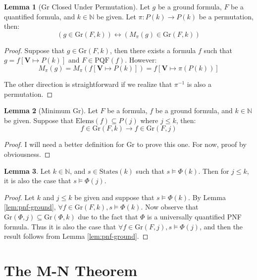 \documentclass[12pt]{article}
\theoremstyle{definition}
\newtheorem{lemma}{Lemma}
\theoremstyle{remark}
\newcommand{\states}{\text{States}}
\newcommand{\gr}{\text{Gr}}
\newcommand{\elems}{\text{Elems}}
\newcommand{\PQF}{\text{PQF}}
\begin{document}
\begin{lemma}[Gr Closed Under Permutation]
  \label{lem:gr-closed}
  Let $g$ be a ground formula, $F$ be a quantified formula, and $k \in \mathbb{N}$ be given.  Let $\pi : P(k) \to P(k)$ be a permutation, then:
  $$(g \in \gr(F,k)) \leftrightarrow (M_\pi(g) \in \gr(F,k))$$
\end{lemma}
\begin{proof}
  Suppose that $g \in \gr(F,k)$, then there exists a formula $f$ such that $g = f[\mathbf{V} \mapsto P(k)]$ and $F \in \PQF(f)$.  However:
  $$M_\pi(g) = M_\pi(f[\mathbf{V} \mapsto P(k)]) = f[\mathbf{V} \mapsto \pi(P(k))]$$

  The other direction is straightforward if we realize that $\pi^{-1}$ is also a permutation.
\end{proof}

\begin{lemma}[Minimum Gr]
  \label{lem:min-gr}
  Let $F$ be a formula, $f$ be a ground formula, and $k \in \mathbb{N}$ be given.  Suppose that $\elems(f) \subseteq P(j)$ where $j \leq k$, then:
  $$f \in \gr(F,k) \rightarrow f \in \gr(F,j)$$
\end{lemma}
\begin{proof}
  I will need a better definition for $\gr$ to prove this one.  For now, proof by obviousness.
\end{proof}

\begin{lemma}
  \label{lem:lt-sat}
  Let $k \in \mathbb{N}$, and $s \in \states(k)$ such that $s \models \Phi(k)$.  Then for $j \leq k$, it is also the case that $s \models \Phi(j)$.
\end{lemma}
\begin{proof}
  Let $k$ and $j \leq k$ be given and suppose that $s \models \Phi(k)$.  By Lemma \ref{lem:pnf-ground}, $\forall f \in \gr(F,k), s \models \Phi(k)$.  Now observe that $\gr(\Phi,j) \subseteq \gr(\Phi,k)$ due to the fact that $\Phi$ is a universally quantified PNF formula.  Thus it is also the case that $\forall f \in \gr(F,j), s \models \Phi(j)$, and then the result follows from Lemma \ref{lem:pnf-ground}.
\end{proof}



\section{The M-N Theorem}
\end{document}
